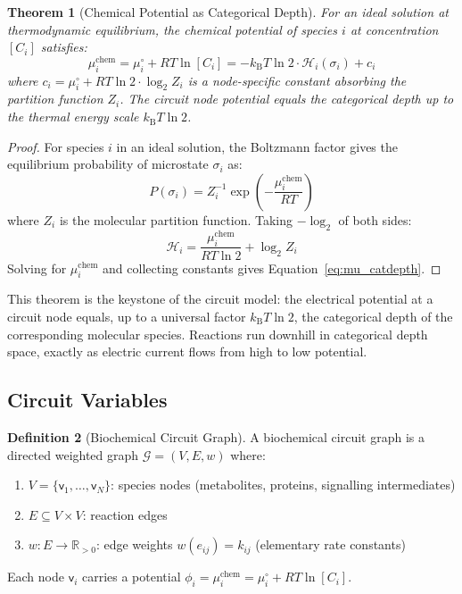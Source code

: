 \documentclass[10pt,twocolumn,a4paper]{article}
\theoremstyle{plain}
\newtheorem{theorem}{Theorem}[section]
\theoremstyle{definition}
\newtheorem{definition}[theorem]{Definition}
\theoremstyle{remark}
\newcommand{\kB}{k_{\mathrm{B}}}
\newcommand{\fnode}{\mathsf{v}}
\newcommand{\circuit}{\mathcal{G}}
\newcommand{\R}{\mathbb{R}}
\newcommand{\Hcat}{\mathcal{H}}
\begin{document}
\begin{theorem}[Chemical Potential as Categorical Depth]
\label{thm:mu_catdepth}
For an ideal solution at thermodynamic equilibrium, the chemical potential of species $i$ at concentration $[C_i]$ satisfies:
\begin{equation}
    \mu_i^{\mathrm{chem}} = \mu_i^\circ + RT\ln[C_i] = -\kB T \ln 2 \cdot \Hcat_i(\sigma_i) + c_i
    \label{eq:mu_catdepth}
\end{equation}
where $c_i = \mu_i^\circ + RT \ln 2 \cdot \log_2 Z_i$ is a node-specific constant absorbing the partition function $Z_i$. The circuit node potential equals the categorical depth up to the thermal energy scale $\kB T \ln 2$.
\end{theorem}

\begin{proof}
For species $i$ in an ideal solution, the Boltzmann factor gives the equilibrium probability of microstate $\sigma_i$ as:
\begin{equation}
    P(\sigma_i) = Z_i^{-1} \exp\left(-\frac{\mu_i^{\mathrm{chem}}}{RT}\right)
\end{equation}
where $Z_i$ is the molecular partition function. Taking $-\log_2$ of both sides:
\begin{equation}
    \Hcat_i = \frac{\mu_i^{\mathrm{chem}}}{RT \ln 2} + \log_2 Z_i
\end{equation}
Solving for $\mu_i^{\mathrm{chem}}$ and collecting constants gives Equation~\ref{eq:mu_catdepth}.
\end{proof}

This theorem is the keystone of the circuit model: the electrical potential at a circuit node equals, up to a universal factor $\kB T \ln 2$, the categorical depth of the corresponding molecular species. Reactions run downhill in categorical depth space, exactly as electric current flows from high to low potential.

\subsection{Circuit Variables}

\begin{definition}[Biochemical Circuit Graph]
\label{def:circuit_graph}
A biochemical circuit graph is a directed weighted graph $\circuit = (V, E, w)$ where:
\begin{enumerate}[label=(\roman*)]
    \item $V = \{\fnode_1, \ldots, \fnode_N\}$: species nodes (metabolites, proteins, signalling intermediates)
    \item $E \subseteq V \times V$: reaction edges
    \item $w: E \to \R_{>0}$: edge weights $w(e_{ij}) = k_{ij}$ (elementary rate constants)
\end{enumerate}
Each node $\fnode_i$ carries a potential $\phi_i = \mu_i^{\mathrm{chem}} = \mu_i^\circ + RT \ln[C_i]$.
\end{definition}
\end{document}

